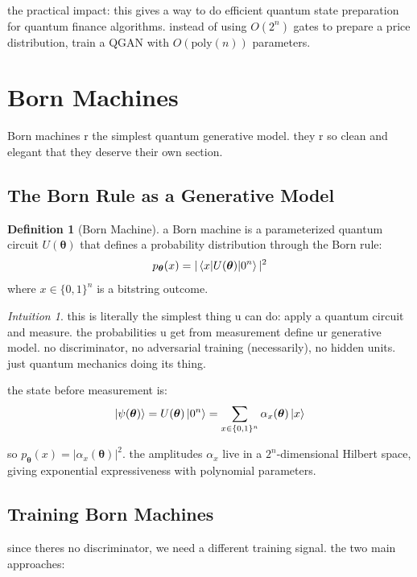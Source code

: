 \documentclass[11pt,a4paper]{article}
\theoremstyle{definition}
\newtheorem{definition}{Definition}[section]
\theoremstyle{remark}
\newtheorem*{intuition}{Intuition}
\begin{document}
the practical impact: this gives a way to do efficient quantum state preparation for quantum finance algorithms. instead of using $O(2^n)$ gates to prepare a price distribution, train a QGAN with $O(\text{poly}(n))$ parameters.

\section{Born Machines}

Born machines r the simplest quantum generative model. they r so clean and elegant that they deserve their own section.

\subsection{The Born Rule as a Generative Model}

\begin{definition}[Born Machine]
a Born machine is a parameterized quantum circuit $U(\boldsymbol{\theta})$ that defines a probability distribution through the Born rule:
\[
p_{\boldsymbol{\theta}}(x) = |\braket{x | U(\boldsymbol{\theta}) | 0^n}|^2
\]
where $x \in \{0, 1\}^n$ is a bitstring outcome.
\end{definition}

\begin{intuition}
this is literally the simplest thing u can do: apply a quantum circuit and measure. the probabilities u get from measurement define ur generative model. no discriminator, no adversarial training (necessarily), no hidden units. just quantum mechanics doing its thing.
\end{intuition}

the state before measurement is:
\[
\ket{\psi(\boldsymbol{\theta})} = U(\boldsymbol{\theta})\ket{0^n} = \sum_{x \in \{0,1\}^n} \alpha_x(\boldsymbol{\theta}) \ket{x}
\]

so $p_{\boldsymbol{\theta}}(x) = |\alpha_x(\boldsymbol{\theta})|^2$. the amplitudes $\alpha_x$ live in a $2^n$-dimensional Hilbert space, giving exponential expressiveness with polynomial parameters.

\subsection{Training Born Machines}

since theres no discriminator, we need a different training signal. the two main approaches:
\end{document}
